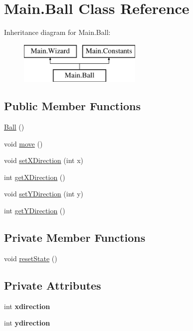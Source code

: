 \hypertarget{class_main_1_1_ball}{}\section{Main.\+Ball Class Reference}
\label{class_main_1_1_ball}
Inheritance diagram for Main.\+Ball\+:\begin{figure}[H]
\begin{center}
\leavevmode
\includegraphics[height=2.000000cm]{class_main_1_1_ball}
\end{center}
\end{figure}
\subsection*{Public Member Functions}
\begin{DoxyCompactItemize}
\item 
\hyperlink{class_main_1_1_ball_a580f1396ea60ed222785d87ae163c5a0}{Ball} ()
\item 
void \hyperlink{class_main_1_1_ball_a00adb8edbc60dacdec6cfac1dd686871}{move} ()
\item 
void \hyperlink{class_main_1_1_ball_a0574633ff91fa6182f8319472208610e}{set\+X\+Direction} (int x)
\item 
int \hyperlink{class_main_1_1_ball_acc35e91c14a087781c30d4ef07ed4883}{get\+X\+Direction} ()
\item 
void \hyperlink{class_main_1_1_ball_a707727e3e5c6fcdb2d06ff438beb7029}{set\+Y\+Direction} (int y)
\item 
int \hyperlink{class_main_1_1_ball_affc1081f609c10e7897ee2da26c81dff}{get\+Y\+Direction} ()
\end{DoxyCompactItemize}
\subsection*{Private Member Functions}
\begin{DoxyCompactItemize}
\item 
void \hyperlink{class_main_1_1_ball_aadbc2f06340363bc41ee7f7646f90460}{reset\+State} ()
\end{DoxyCompactItemize}
\subsection*{Private Attributes}
\begin{DoxyCompactItemize}
\item 
int {\bfseries xdirection}\hypertarget{class_main_1_1_ball_a45d26a9c6639a1b43bf69b983bd70456}{}\label{class_main_1_1_ball_a45d26a9c6639a1b43bf69b983bd70456}

\item 
int {\bfseries ydirection}\hypertarget{class_main_1_1_ball_af586900d4b05b81bc64245a77bf49955}{}\label{class_main_1_1_ball_af586900d4b05b81bc64245a77bf49955}

\end{DoxyCompactItemize}
